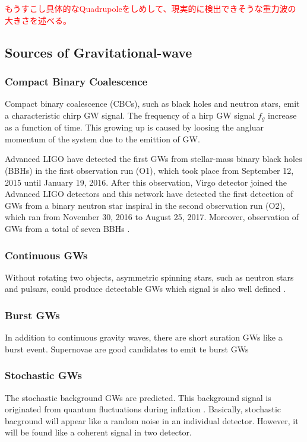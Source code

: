 \textcolor{red}{もうすこし具体的なQuadrupoleをしめして、現実的に検出できそうな重力波の大きさを述べる。}

\subsection{Sources of Gravitational-wave}
\subsubsection{Compact Binary Coalescence}
Compact binary coalescence (CBCs), such as black holes and neutron stars, emit a characteristic chirp GW signal. The frequency of a hirp GW signal $f_{g}$ increase as a function of time. This growing up is caused by loosing the angluar momentum of the system due to the emittion of GW. 

Advanced LIGO have detected the first GWs from stellar-mass binary black holes (BBHs) in the first observation run (O1), which took place from September 12, 2015 until January 19, 2016. After this observation, Virgo detector joined the Advanced LIGO detectors and this network have detected the first detection of GWs from a binary neutron star inspiral in the second observation run (O2), which ran from November 30, 2016 to August 25, 2017. Moreover, observation of GWs from a total of seven BBHs \cite{abbott2019gwtc}.


\subsubsection{Continuous GWs}
Without rotating two objects, asymmetric spinning stars, such as neutron stars and pulsars, could produce detectable GWs which signal is also well defined \cite{leaci2012searching,hereld1984search}.

\subsubsection{Burst GWs}
In addition to continuous gravity waves, there are short suration GWs like a burst event. Supernovae are good candidates to emit te burst GWs \cite{ott2004gravitational}

\subsubsection{Stochastic GWs}
The stochastic background GWs are predicted\cite{starobinskii1979spectrum,Christensen_2018}. This background signal is originated from quantum fluctuations during inflation \cite{PhysRevD.23.347}. Basically, stochastic bacground will appear like a random noise in an individual detector. However, it will be found like a coherent signal in two detector.

